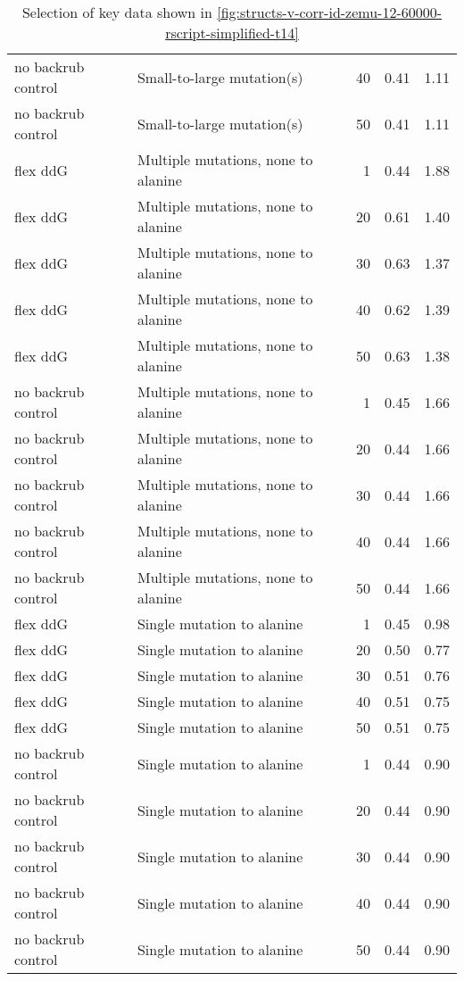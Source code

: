 \begin{table}
\begin{tabular}{llrrr}
 no backrub control &           Small-to-large mutation(s) &          40 & 0.41 & 1.11 \\
 no backrub control &           Small-to-large mutation(s) &          50 & 0.41 & 1.11 \\
           flex ddG &  Multiple mutations, none to alanine &           1 & 0.44 & 1.88 \\
           flex ddG &  Multiple mutations, none to alanine &          20 & 0.61 & 1.40 \\
           flex ddG &  Multiple mutations, none to alanine &          30 & 0.63 & 1.37 \\
           flex ddG &  Multiple mutations, none to alanine &          40 & 0.62 & 1.39 \\
           flex ddG &  Multiple mutations, none to alanine &          50 & 0.63 & 1.38 \\
 no backrub control &  Multiple mutations, none to alanine &           1 & 0.45 & 1.66 \\
 no backrub control &  Multiple mutations, none to alanine &          20 & 0.44 & 1.66 \\
 no backrub control &  Multiple mutations, none to alanine &          30 & 0.44 & 1.66 \\
 no backrub control &  Multiple mutations, none to alanine &          40 & 0.44 & 1.66 \\
 no backrub control &  Multiple mutations, none to alanine &          50 & 0.44 & 1.66 \\
           flex ddG &           Single mutation to alanine &           1 & 0.45 & 0.98 \\
           flex ddG &           Single mutation to alanine &          20 & 0.50 & 0.77 \\
           flex ddG &           Single mutation to alanine &          30 & 0.51 & 0.76 \\
           flex ddG &           Single mutation to alanine &          40 & 0.51 & 0.75 \\
           flex ddG &           Single mutation to alanine &          50 & 0.51 & 0.75 \\
 no backrub control &           Single mutation to alanine &           1 & 0.44 & 0.90 \\
 no backrub control &           Single mutation to alanine &          20 & 0.44 & 0.90 \\
 no backrub control &           Single mutation to alanine &          30 & 0.44 & 0.90 \\
 no backrub control &           Single mutation to alanine &          40 & 0.44 & 0.90 \\
 no backrub control &           Single mutation to alanine &          50 & 0.44 & 0.90 \\
\bottomrule
\end{tabular}

\caption[]{Selection of key data shown in \cref{fig:structs-v-corr-id-zemu-12-60000-rscript-simplified-t14}}
\label{tab:structs-v-corr-id-zemu-12-60000-rscript-simplified-t14-underlying-data}
\end{table}
